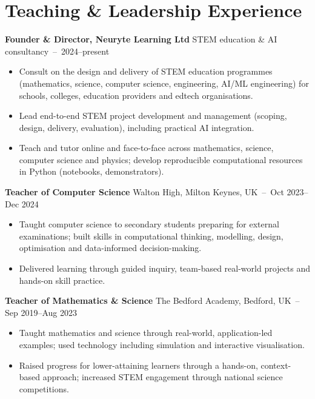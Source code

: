 \documentclass[10pt,a4paper]{article}
\newcommand{\entry}[2]{{\textbf{#1}} \hfill {\small\color{muted}#2}\\[1pt]}
\begin{document}
\section{Teaching \& Leadership Experience}
\entry{Founder \& Director, Neuryte Learning Ltd}{STEM education \& AI consultancy \,--\, 2024--present}
\begin{itemize}[leftmargin=1.3em,itemsep=1.5pt,topsep=2pt]
  \item Consult on the design and delivery of STEM education programmes (mathematics, science, computer science, engineering, AI/ML engineering) for schools, colleges, education providers and edtech organisations.
  \item Lead end-to-end STEM project development and management (scoping, design, delivery, evaluation), including practical AI integration.
  \item Teach and tutor online and face-to-face across mathematics, science, computer science and physics; develop reproducible computational resources in Python (notebooks, demonstrators).
\end{itemize}

\entry{Teacher of Computer Science}{Walton High, Milton Keynes, UK \,--\, Oct 2023--Dec 2024}
\begin{itemize}[leftmargin=1.3em,itemsep=1.5pt,topsep=2pt]
  \item Taught computer science to secondary students preparing for external examinations; built skills in computational thinking, modelling, design, optimisation and data-informed decision-making.
  \item Delivered learning through guided inquiry, team-based real-world projects and hands-on skill practice.
\end{itemize}

\entry{Teacher of Mathematics \& Science}{The Bedford Academy, Bedford, UK \,--\, Sep 2019--Aug 2023}
\begin{itemize}[leftmargin=1.3em,itemsep=1.5pt,topsep=2pt]
  \item Taught mathematics and science through real-world, application-led examples; used technology including simulation and interactive visualisation.
  \item Raised progress for lower-attaining learners through a hands-on, context-based approach; increased STEM engagement through national science competitions.
\end{itemize}
\end{document}
